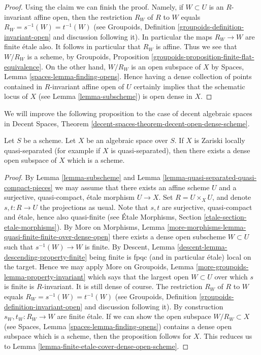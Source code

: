 \begin{proof}
\medskip\noindent
Using the claim we can finish the proof. Namely, if $W \subset U$ is
an $R$-invariant affine open, then the restriction $R_W$ of $R$ to $W$
equals $R_W = s^{-1}(W) = t^{-1}(W)$ (see
Groupoids, Definition \ref{groupoids-definition-invariant-open}
and discussion following it). In particular the maps $R_W \to W$ are
finite \'etale also. It follows in particular that $R_W$ is affine.
Thus we see that $W/R_W$ is a scheme, by
Groupoids, Proposition \ref{groupoids-proposition-finite-flat-equivalence}.
On the other hand, $W/R_W$ is an open subspace of $X$ by
Spaces, Lemma \ref{spaces-lemma-finding-opens}.
Hence having a dense collection of points contained in $R$-invariant
affine open of $U$ certainly implies that the schematic locus of $X$
(see Lemma \ref{lemma-subscheme})
is open dense in $X$.
\end{proof}

\noindent
We will improve the following proposition to the case of
decent algebraic spaces in
Decent Spaces, Theorem
\ref{decent-spaces-theorem-decent-open-dense-scheme}.

\begin{proposition}
\label{proposition-locally-quasi-separated-open-dense-scheme}
Let $S$ be a scheme. Let $X$ be an algebraic space over $S$. If $X$ is
Zariski locally quasi-separated (for example if $X$ is quasi-separated), then
there exists a dense open subspace of $X$ which is a scheme.
\end{proposition}

\begin{proof}
By
Lemma \ref{lemma-subscheme}
and
Lemma \ref{lemma-quasi-separated-quasi-compact-pieces}
we may assume that there exists an affine scheme $U$ and a
surjective, quasi-compact, \'etale morphism $U \to X$.
Set $R = U \times_X U$, and denote $s, t : R \to U$ the projections
as usual. Note that $s, t$ are surjective, quasi-compact and \'etale, hence
also quasi-finite (see
\'Etale Morphisms, Section \ref{etale-section-etale-morphisms}).
By
More on Morphisms,
Lemma \ref{more-morphisms-lemma-quasi-finite-finite-over-dense-open}
there exists a dense open subscheme $W \subset U$ such that
$s^{-1}(W) \to W$ is finite. By
Descent, Lemma \ref{descent-lemma-descending-property-finite}
being finite is fpqc (and in particular \'etale) local on the target.
Hence we may apply
More on Groupoids, Lemma \ref{more-groupoids-lemma-property-invariant}
which says that the largest open $W \subset U$ over which $s$ is
finite is $R$-invariant. It is still dense of course.
The restriction $R_W$ of $R$ to $W$ equals $R_W = s^{-1}(W) = t^{-1}(W)$
(see Groupoids, Definition \ref{groupoids-definition-invariant-open}
and discussion following it).
By construction $s_W, t_W : R_W \to W$ are finite \'etale.
If we can show the open subspace $W/R_W \subset X$ (see
Spaces, Lemma \ref{spaces-lemma-finding-opens})
contains a dense open subspace which is a scheme, then the
proposition follows for $X$. This reduces us to
Lemma \ref{lemma-finite-etale-cover-dense-open-scheme}.
\end{proof}




